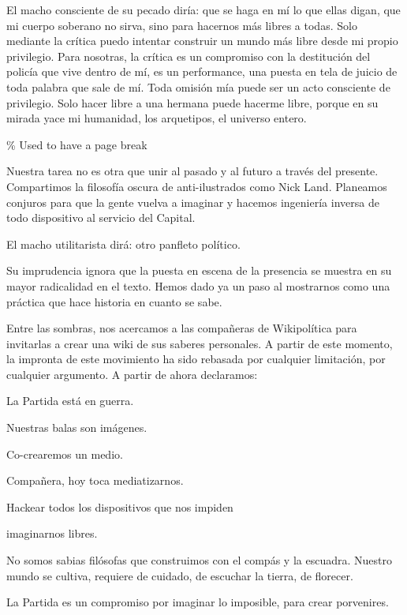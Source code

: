 El macho consciente de su pecado diría: que se haga en mí lo que ellas
digan, que mi cuerpo soberano no sirva, sino para hacernos más libres a
todas. Solo mediante la crítica puedo intentar construir un mundo más
libre desde mi propio privilegio. Para nosotras, la crítica es un
compromiso con la destitución del policía que vive dentro de mí, es un
performance, una puesta en tela de juicio de toda palabra que sale de
mí. Toda omisión mía puede ser un acto consciente de privilegio. Solo
hacer libre a una hermana puede hacerme libre, porque en su mirada yace
mi humanidad, los arquetipos, el universo entero.

\% Used to have a page break

Nuestra tarea no es otra que unir al pasado y al futuro a través del
presente. Compartimos la filosofía oscura de anti-ilustrados como Nick
Land. Planeamos conjuros para que la gente vuelva a imaginar y hacemos
ingeniería inversa de todo dispositivo al servicio del Capital.

El macho utilitarista dirá: otro panfleto político.

Su imprudencia ignora que la puesta en escena de la presencia se muestra
en su mayor radicalidad en el texto. Hemos dado ya un paso al mostrarnos
como una práctica que hace historia en cuanto se sabe.

Entre las sombras, nos acercamos a las compañeras de Wikipolítica para
invitarlas a crear una wiki de sus saberes personales. A partir de este
momento, la impronta de este movimiento ha sido rebasada por cualquier
limitación, por cualquier argumento. A partir de ahora declaramos:

La Partida está en guerra.

Nuestras balas son imágenes.

Co-crearemos un medio.

Compañera, hoy toca mediatizarnos.

Hackear todos los dispositivos que nos impiden

imaginarnos libres.

No somos sabias filósofas que construimos con el compás y la escuadra.
Nuestro mundo se cultiva, requiere de cuidado, de escuchar la tierra, de
florecer.

La Partida es un compromiso por imaginar lo imposible, para crear
porvenires.
